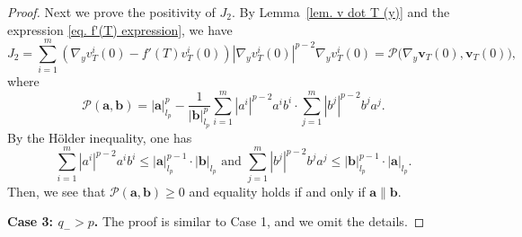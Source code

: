 \documentclass[11pt,twoside,reqno]{amsart}
\numberwithin{equation}{section}
\begin{document}
\begin{proof}
Next we prove the positivity of $J_{2}$. By Lemma~\ref{lem. v dot T (y)} and the expression \eqref{eq. f'(T) expression}, we have
\begin{equation*}
J_2=\sum_{i=1}^{m}\left(\nabla_{y}v_{T}^{i}(0)-f'(T)v_{T}^{i}(0)\right)|\nabla_{y}v_{T}^{i}(0)|^{p-2}\nabla_{y}v_{T}^{i}(0)=\mathcal{P}\Big(\nabla_{y}\mathbf{v}_{T}(0),\mathbf{v}_{T}(0)\Big),
\end{equation*}
where
\begin{equation*}
    \mathcal{P}(\mathbf{a},\mathbf{b})=|\mathbf{a}|_{l_{p}}^{p}-\frac{1}{|\mathbf{b}|_{l_{p}}^{p}}\sum_{i=1}^{m}|a^{i}|^{p-2}a^{i}b^{i}\cdot\sum_{j=1}^{m}|b^{j}|^{p-2}b^{j}a^{j}.
\end{equation*}
By the H\"older inequality, one has
\begin{equation*}
    \sum_{i=1}^{m}|a^{i}|^{p-2}a^{i}b^{i}\leq|\mathbf{a}|_{l_{p}}^{p-1}\cdot|\mathbf{b}|_{l_{p}}\mbox{ and }\sum_{j=1}^{m}|b^{j}|^{p-2}b^{j}a^{j}\leq|\mathbf{b}|_{l_{p}}^{p-1}\cdot|\mathbf{a}|_{l_{p}}.
\end{equation*}
Then, we see that $\mathcal{P}(\mathbf{a},\mathbf{b})\geq0$ and equality holds if and only if $\mathbf{a}\parallel\mathbf{b}$.

{\bf{Case 3:  $q_{-}>p$.}} The proof is similar to Case 1, and we omit the details. 
\end{proof}
\end{document}
